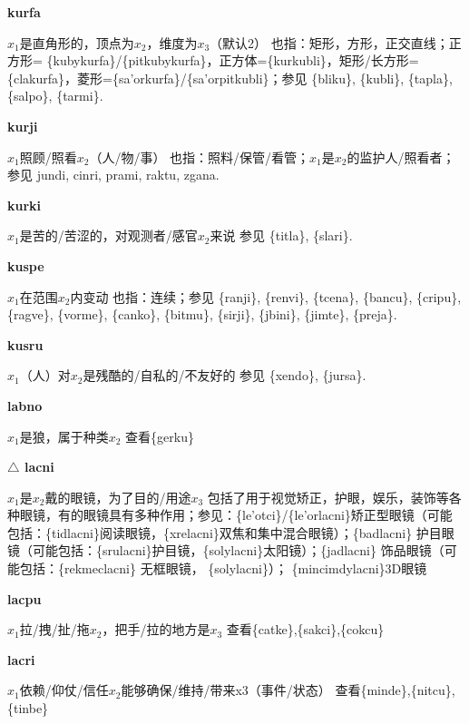 \documentclass[notitlepage,twocolumn,a4paper,10pt]{book}
\begin{document}
{\sffamily\bfseries kurfa}\enspace {\ttfamily\bfseries[kur]}  $x_1$是直角形的，顶点为$x_2$，维度为$x_3$（默认2） \textemdash{} 也指：矩形，方形，正交直线；正方形= \{kubykurfa\}\slash{}\{pitkubykurfa\}，正方体=\{kurkubli\}，矩形\slash{}长方形= \{clakurfa\}，菱形=\{sa'orkurfa\}\slash{}\{sa'orpitkubli\}；参见 \{bliku\}, \{kubli\}, \{tapla\}, \{salpo\}, \{tarmi\}.

{\sffamily\bfseries kurji}\enspace {\ttfamily\bfseries[kuj     ku'i]}  $x_1$照顾\slash{}照看$x_2$（人\slash{}物\slash{}事） \textemdash{} 也指：照料\slash{}保管\slash{}看管；$x_1$是$x_2$的监护人\slash{}照看者；参见 {jundi}, {cinri}, {prami}, {raktu}, {zgana}.

{\sffamily\bfseries kurki} $x_1$是苦的\slash{}苦涩的，对观测者\slash{}感官$x_2$来说 \textemdash{} 参见 \{titla\}, \{slari\}.

{\sffamily\bfseries kuspe}\enspace {\ttfamily\bfseries[kup     ku'e]}  $x_1$在范围$x_2$内变动 \textemdash{} 也指：连续；参见 \{ranji\}, \{renvi\}, \{tcena\}, \{bancu\}, \{cripu\}, \{ragve\}, \{vorme\}, \{canko\}, \{bitmu\}, \{sirji\}, \{jbini\}, \{jimte\}, \{preja\}.

{\sffamily\bfseries kusru}\enspace {\ttfamily\bfseries[kus]}  $x_1$（人）对$x_2$是残酷的\slash{}自私的\slash{}不友好的 \textemdash{} 参见 \{xendo\}, \{jursa\}.

{\sffamily\bfseries labno} $x_{1}$是狼，属于种类$x_{2}$ \textemdash{} 查看\{gerku\}

{\sffamily\bfseries $\triangle$ lacni} $x_1$是$x_2$戴的眼镜，为了目的\slash{}用途$x_3$ \textemdash{} 包括了用于视觉矫正，护眼，娱乐，装饰等各种眼镜，有的眼镜具有多种作用；参见：\{le'otci\}\slash{}\{le'orlacni\}矫正型眼镜（可能包括：\{tidlacni\}阅读眼镜，\{xrelacni\}双焦和集中混合眼镜）；\{badlacni\} 护目眼镜（可能包括：\{srulacni\}护目镜，\{solylacni\}太阳镜）；\{jadlacni\} 饰品眼镜（可能包括：\{rekmeclacni\} 无框眼镜， \{solylacni\}）； \{mincimdylacni\}3D眼镜

{\sffamily\bfseries lacpu}  $x_1$拉\slash{}拽\slash{}扯\slash{}拖$x_2$，把手\slash{}拉的地方是$x_3$ \textemdash{} 查看\{catke\},\{sakci\},\{cokcu\}

{\sffamily\bfseries lacri}\enspace {\ttfamily\bfseries[lac]}  $x_1$依赖\slash{}仰仗\slash{}信任$x_2$能够确保\slash{}维持\slash{}带来x3（事件\slash{}状态） \textemdash{} 查看\{minde\},\{nitcu\},\{tinbe\}
\end{document}

